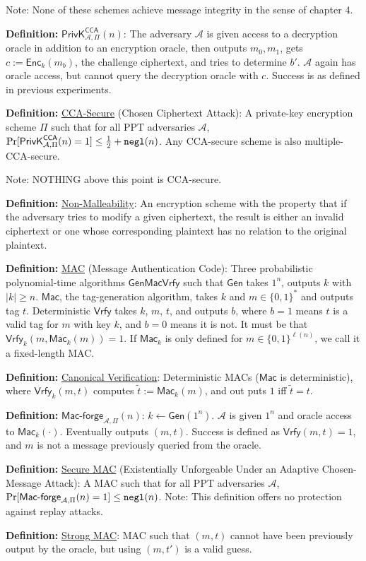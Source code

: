 \documentclass[12pt]{article}
\newcommand{\AAA}{\mathcal{A}}
\newcommand{\defn}[1]{{\bf Definition:} \underline{#1}}
\newcommand{\Enc}{\mathsf{Enc}}
\newcommand{\Mac}{\mathsf{Mac}}
\newcommand{\Macf}{\mathsf{Mac\text{-}forge}}
\newcommand{\Vrfy}{\mathsf{Vrfy}}
\newcommand{\Gen}{\mathsf{Gen}}
\newcommand{\ExptCcaArgs}[2]{\mathsf{PrivK}^{\mathsf{CCA}}_{#1,#2}}
\newcommand{\ExptCca}{\ExptCcaArgs{\AAA}{\Pi}}
\newcommand{\negl}{{\tt negl}}
\newcommand{\from}{\leftarrow}
\begin{document}
\begin{multicols}{3}
Note: None of these schemes achieve message integrity in the sense of chapter 4.

\defn{$\ExptCca(n)$}: The adversary $\AAA$ is given access to a decryption oracle in addition to an encryption oracle, then outputs $m_0,m_1$, gets $c:=\Enc_k(m_b)$, the challenge ciphertext, and tries to determine $b'$. $\AAA$ again has oracle access, but cannot query the decryption oracle with $c$. Success is as defined in previous experiments.

\defn{CCA-Secure} (Chosen Ciphertext Attack): A private-key encryption scheme $\Pi$ such that for all PPT adversaries $\AAA$, $\Pr[\ExptCca(n)=1]\leq\frac{1}{2}+\negl(n)$. Any CCA-secure scheme is also multiple-CCA-secure.

Note: NOTHING above this point is CCA-secure.

\defn{Non-Malleability}: An encryption scheme with the property that if the adversary tries to modify a given ciphertext, the result is either an invalid ciphertext or one whose corresponding plaintext has no relation to the original plaintext.

\defn{MAC} (Message Authentication Code): Three probabilistic polynomial-time algorithms $\Gen\Mac\Vrfy$ such that $\Gen$ takes $1^n$, outputs $k$ with $|k|\geq n$. $\Mac$, the tag-generation algorithm, takes $k$ and $m\in\{0,1\}^*$ and outputs tag $t$. Deterministic $\Vrfy$ takes $k$, $m$, $t$, and outputs $b$, where $b=1$ means $t$ is a valid tag for $m$ with key $k$, and $b=0$ means it is not. It must be that $\Vrfy_k(m,\Mac_k(m))=1$. If $\Mac_k$ is only defined for $m\in\{0,1\}^{\ell(n)}$, we call it a fixed-length MAC.

\defn{Canonical Verification}: Deterministic MACs ($\Mac$ is deterministic), where $\Vrfy_k(m,t)$ computes $\tilde{t}:=\Mac_k(m)$, and out puts $1$ iff $\tilde{t}=t$.

\defn{$\Macf_{\AAA,\Pi}(n)$}: $k\from\Gen(1^n)$. $\AAA$ is given $1^n$ and oracle access to $\Mac_k(\cdot)$. Eventually outputs $(m,t)$. Success is defined as $\Vrfy(m,t)=1$, and $m$ is not a message previously queried from the oracle.

\defn{Secure MAC} (Existentially Unforgeable Under an Adaptive Chosen-Message Attack): A MAC such that for all PPT adversaries $\AAA$, $\Pr[\Macf_{\AAA,\Pi}(n)=1]\leq\negl(n)$. Note: This definition offers no protection against replay attacks.

\defn{Strong MAC}: MAC such that $(m,t)$ cannot have been previously output by the oracle, but using $(m,t')$ is a valid guess.


\end{multicols}
\end{document}
